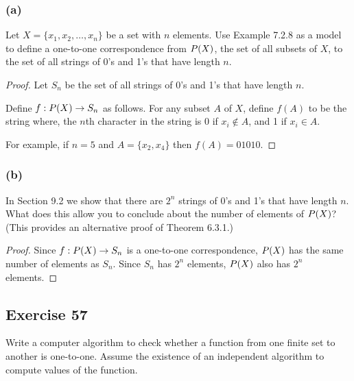 \documentclass[14pt]{extarticle}
\let\mathscr\relax
\newcommand{\ps}{\mathscr{P}} %
\begin{document}
\subsubsection{(a)}
Let \(X = \{x_1, x_2 , \ldots, x_n\}\) be a set with $n$ elements. Use Example 7.2.8 as a model to define a 
one-to-one correspondence from \(\ps(X)\), the set of all subsets of $X$, to the set of all strings of 0’s and 1’s 
that have length $n$.

\begin{proof}
Let $S_n$ be the set of all strings of 0's and 1's that have length $n$. 

Define \(f : \ps(X) \to S_n\) as follows. For any subset $A$ of $X$, define $f(A)$ to be the string where, the $n$th 
character in the string is 0 if \(x_i \notin A\), and 1 if \(x_i \in A\).

For example, if $n=5$ and \(A = \{x_2, x_4\}\) then \(f(A) = 01010\).
\end{proof}

\subsubsection{(b)}
In Section 9.2 we show that there are $2^n$ strings of 0’s and 1’s that have length $n$. What does this allow you to 
conclude about the number of elements of $\ps(X)$? (This provides an alternative proof of Theorem 6.3.1.)

\begin{proof}
Since \(f: \ps(X) \to S_n\) is a one-to-one correspondence, \(\ps(X)\) has the same number of elements as \(S_n\). 
Since \(S_n\) has $2^n$ elements, $\ps(X)$ also has $2^n$ elements.
\end{proof}

\subsection{Exercise 57}
Write a computer algorithm to check whether a function from one finite set to another is one-to-one. Assume the 
existence of an independent algorithm to compute values of the function.
\end{document}
